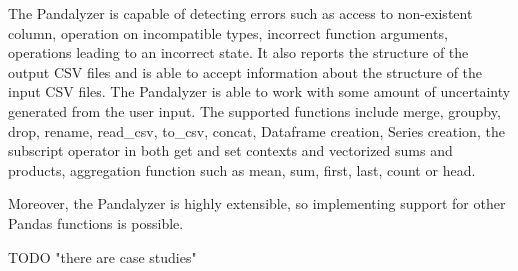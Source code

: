 \Large
The Pandalyzer is capable of detecting errors such as access to non-existent column, operation on incompatible types,
incorrect function arguments, operations leading to an incorrect state.
It also reports the structure of the output CSV files and is able to accept information about the structure of the input CSV files.
The Pandalyzer is able to work with some amount of uncertainty generated from the user input.
The supported functions include merge, groupby, drop, rename, read\_csv, to\_csv, concat, Dataframe creation,
Series creation, the subscript operator in both get and set contexts and vectorized sums and products, aggregation function
such as mean, sum, first, last, count or head.

Moreover, the Pandalyzer is highly extensible, so implementing support for other Pandas functions is possible.

TODO "there are case studies"
